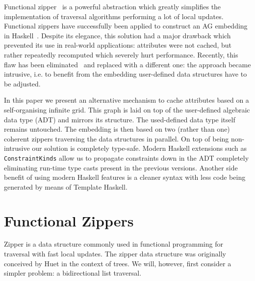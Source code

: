 \documentclass[runningheads]{llncs}
\begin{document}
  Functional zipper~\cite{huet1997zipper} is a powerful abstraction which
  greatly simplifies the implementation of traversal algorithms performing a lot
  of local updates. Functional zippers have successfully been applied to
  construct an AG embedding in
  Haskell~\cite{DBLP:conf/sblp/MartinsFS13,MARTINS20162}. Despite its elegance,
  this solution had a major drawback which prevented its use in real-world
  applications: attributes were not cached, but rather repeatedly recomputed
  which severely hurt performance. Recently, this flaw has been
  eliminated~\cite{FERNANDES2018} and replaced with a different one: the
  approach became intrusive, i.e. to benefit from the embedding user-defined
  data structures have to be adjusted.

  In this paper we present an alternative mechanism to cache attributes based on
  a self-organising infinite grid. This graph is laid on top of the user-defined
  algebraic data type (ADT) and mirrors its structure. The used-defined data type
  itself remains untouched. The embedding is then based on two (rather than one)
  coherent zippers traversing the data structures in parallel. On top of being
  non-intrusive our solution is completely type-safe. Modern Haskell extensions
  such as \texttt{ConstraintKinds} allow us to propagate constraints down in the
  ADT completely eliminating run-time type casts present in the previous
  versions. Another side benefit of using modern Haskell features is a cleaner
  syntax with less code being generated by means of Template Haskell.



\section{Functional Zippers}
  Zipper is a data structure commonly used in functional programming for
  traversal with fast local updates. The zipper data structure was originally
  conceived by Huet\cite{huet1997zipper} in the context of trees. We will,
  however, first consider a simpler problem: a bidirectional list traversal.
\end{document}
